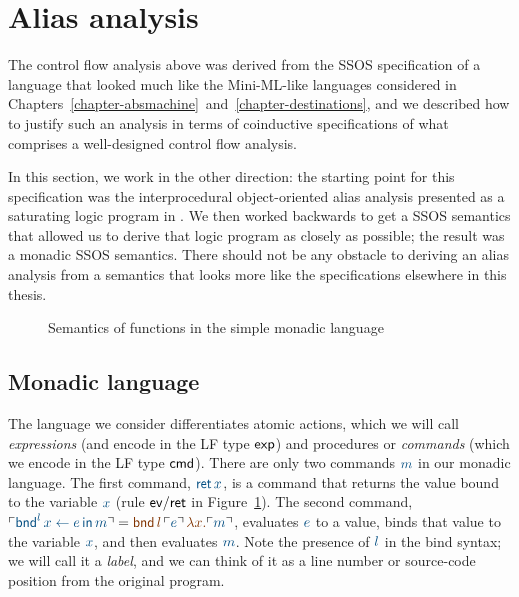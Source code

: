 \section{Alias analysis}
\label{sec:aliasanalysis}

The control flow analysis above was derived from the SSOS
specification of a language that looked much like the Mini-ML-like
languages considered in
Chapters~\ref{chapter-absmachine}~and~\ref{chapter-destinations}, and
we described how to justify such an analysis in terms of coinductive
specifications of what comprises a well-designed control flow
analysis.

In this section, we work in the other direction: the starting point
for this specification was the interprocedural object-oriented alias
analysis presented as a saturating logic program in \cite[Chapter
12.4]{aho07compilers}. We then worked backwards to get a SSOS
semantics that allowed us to derive that logic program as closely as
possible; the result was a monadic SSOS semantics. There should
not be any obstacle to deriving an alias analysis from a
semantics that looks more like the specifications elsewhere in this
thesis.

\begin{figure}
\caption{Semantics of functions in the simple monadic language}
\label{fig:ssos-monadic}
\end{figure}

\subsection{Monadic language}

The language we consider differentiates atomic actions, which we will
call {\it expressions} (and encode in the LF type ${\sf exp}$) and
procedures or {\it commands} (which we encode in the LF type ${\sf
  cmd}$). There are only two commands $\obj{m}$ in our monadic language. The
first command, $\obj{{\sf ret}\,x}$, is a command that returns the value
bound to the variable $\obj{x}$ (rule ${\sf ev/ret}$ in
Figure~\ref{fig:ssos-monadic}). The second command, $\interp{{\sf
    bnd}^l\, x \leftarrow e \,{\sf in}\,m} = \lf{{\sf
  bnd}\,l\,\interp{e}\,\lambda x.\interp{m}}$, evaluates $\obj{e}$ to a
value, binds that value to the variable $\obj{x}$, and then evaluates
$\obj{m}$. Note the presence of $\obj{l}$ 
in the bind syntax; we will call it a
{\it label}, and we can think of it as a line number or source-code
position from the original program.

